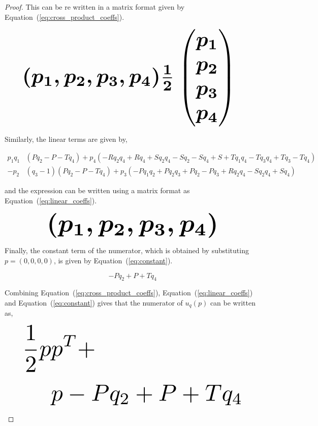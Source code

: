 \begin{proof}
This can be re written in a matrix format given by
Equation~(\ref{eq:cross_product_coeffs}).

\begin{equation}\label{eq:cross_product_coeffs}
    \resizebox{0.9\linewidth}{!}{\arraycolsep=2.5pt%
    \boldmath\(
    (p_1, p_2, p_3, p_4) \frac{1}{2}  \begin{pmatrix}
    p_1 \\
    p_2 \\
    p_3 \\
    p_4 \end{pmatrix}
    \) }
\end{equation}

Similarly, the linear terms are given by,

\begingroup
\footnotesize
\begin{align*}
p_{1} q_{1} & (P q_{2} - P - T q_{4}) + p_{4} (- R q_{2} q_{4} + R q_{4} + S q_{2} q_{4} - S q_{2} - S q_{4} + S + T q_{1} q_{4} - T q_{3} q_{4} + T q_{3} - T q_{4})\\
- p_{2} & (q_{3} - 1) (P q_{2} - P - T q_{4}) + p_{3} (- P q_{1} q_{2} + P q_{2} q_{3} + P q_{2} - P q_{3} + R q_{2} q_{4} - S q_{2} q_{4} + S q_{4})
\end{align*}
\endgroup

and the expression can be written using a matrix format as
Equation~(\ref{eq:linear_coeffs}).

\begin{equation}\label{eq:linear_coeffs}
    \resizebox{0.7\linewidth}{!}{\arraycolsep=2.5pt%
    \boldmath\(
    (p_1, p_2, p_3, p_4) \)}
\end{equation}

Finally, the constant term of the numerator, which is obtained by
substituting $p=(0, 0, 0, 0)$, is given by Equation~(\ref{eq:constant}).

\begin{equation}\label{eq:constant}
- P q_{2} + P + T q_{4}
\end{equation}

Combining Equation~(\ref{eq:cross_product_coeffs}), Equation~(\ref{eq:linear_coeffs}) and
Equation~(\ref{eq:constant}) gives that the numerator of \(u_q(p)\) can be written
as,

\begingroup
\boldmath
\begin{equation*}
\resizebox{0.9\textwidth}{!}{$ \begin{split}
    \frac{1}{2}p &  p^T +  \\
    &  p - P q_{2} + P + T q_{4}
\end{split} $}
\end{equation*}
\endgroup


\end{proof}
